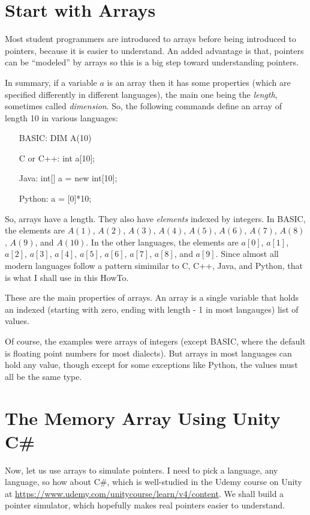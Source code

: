 \documentclass[letter,12pt]{article}
\begin{document}
\section{Start with Arrays}

Most student programmers are introduced to arrays before being introduced to pointers, because it is easier to understand.  An added advantage is that, pointers can be “modeled” by arrays so this is a big step toward understanding pointers.

In summary, if a variable $a$ is an array then it has some properties (which are specified differently in different languages), the main one being the \emph{length}, sometimes called \emph{dimension}.  So, the following commands define an array of length 10 in various languages:

\begin{itemize}
\item[BASIC:] DIM A(10)
\item[C or C++:] int a[10];
\item[Java:] int[] a = new int[10];
\item[Python:] a = [0]*10;
\end{itemize}

So, arrays have a length.  They also have \emph{elements} indexed by integers.  In BASIC, the elements are 
$A(1)$, $A(2)$, $A(3)$, $A(4)$, $A(5)$, $A(6)$, $A(7)$, $A(8)$, $A(9)$, and $A(10)$.  In the other languages, the elements are $a[0]$, $a[1]$, $a[2]$, $a[3]$, $a[4]$, $a[5]$, $a[6]$, $a[7]$, $a[8]$, and $a[9]$. Since almost all modern languages follow a pattern simimilar to C, C++, Java, and Python, that is what I shall use in this HowTo.  

These are the main properties of arrays.  An array is a single variable that holds an indexed (starting with zero, ending with length - 1 in most langauges) list of values.

Of course, the examples were arrays of integers (except BASIC, where the default is floating point numbers for most dialects).  But arrays in most languages can hold any value, though except for some exceptions like Python, the values must all be the same type.

\section{The Memory Array Using Unity C\#}

Now, let us use arrays to simulate pointers.  I need to pick a language, any language, so how about C\#, which is well-studied in the Udemy course on Unity at \url{https://www.udemy.com/unitycourse/learn/v4/content}.  We shall build a pointer simulator, which hopefully makes real pointers easier to understand.
\end{document}
